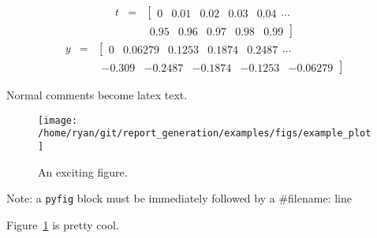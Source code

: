 \documentclass[12pt]{article}
\begin{document}
\begin{eqnarray}
t  & = &\left[ \begin{array}{ccccc}
0 & 0.01 & 0.02 & 0.03 & 0.04
\end{array} \right.  \ldots \\
& & \left. \begin{array}{ccccc}
0.95 & 0.96 & 0.97 & 0.98 & 0.99
\end{array} \right]
\end{eqnarray}
\begin{eqnarray}
y  & = &\left[ \begin{array}{ccccc}
0 & 0.06279 & 0.1253 & 0.1874 & 0.2487
\end{array} \right.  \ldots \\
& & \left. \begin{array}{ccccc}
-0.309 & -0.2487 & -0.1874 & -0.1253 & -0.06279
\end{array} \right]
\end{eqnarray}

Normal comments become latex text.


\begin{figure}
\begin{center}
\texttt{[image: /home/ryan/git/report\_generation/examples/figs/example\_plot]}
\end{center}
\caption{An exciting figure.}
\label{fig:exciting}
\end{figure}
Note: a \texttt{pyfig} block must be immediately followed by a
\#filename: line

Figure~\ref{fig:exciting} is pretty cool.
\end{document}
